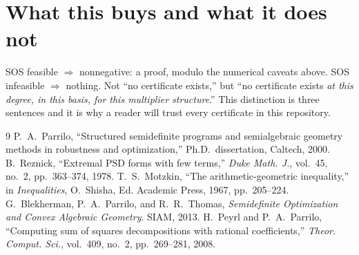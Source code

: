 \documentclass[11pt]{article}
\begin{document}
\section{What this buys and what it does not}
SOS feasible $\Rightarrow$ nonnegative: a proof, modulo the numerical caveats
above. SOS infeasible $\Rightarrow$ nothing. Not ``no certificate exists,''
but ``no certificate exists \emph{at this degree, in this basis, for this
multiplier structure}.'' This distinction is three sentences and it is why
a reader will trust every certificate in this repository.

\begin{thebibliography}{9}
 P.~A.~Parrilo, ``Structured semidefinite programs
  and semialgebraic geometry methods in robustness and optimization,''
  Ph.D.~dissertation, Caltech, 2000.
 B.~Reznick, ``Extremal PSD forms with few terms,''
  \emph{Duke Math. J.}, vol.~45, no.~2, pp.~363--374, 1978.
 T.~S.~Motzkin, ``The arithmetic-geometric
  inequality,'' in \emph{Inequalities}, O.~Shisha, Ed. Academic Press,
  1967, pp.~205--224.
 G.~Blekherman, P.~A.~Parrilo, and R.~R.~Thomas,
  \emph{Semidefinite Optimization and Convex Algebraic Geometry}.
  SIAM, 2013.
 H.~Peyrl and P.~A.~Parrilo, ``Computing sum
  of squares decompositions with rational coefficients,''
  \emph{Theor. Comput. Sci.}, vol.~409, no.~2, pp.~269--281, 2008.
\end{thebibliography}
\end{document}
